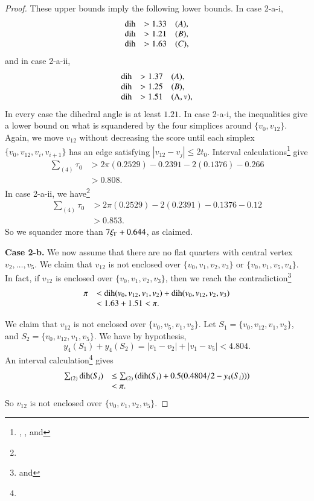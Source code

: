 \begin{proof}
These upper bounds imply the following lower bounds.  In case
2-a-i,
$$
\begin{array}{lll}
\operatorname{dih} &> 1.33 \quad(A),\\
\operatorname{dih} &> 1.21 \quad(B),\\
\operatorname{dih} &> 1.63 \quad(C),\\
\end{array}
$$
and in case 2-a-ii,
$$
\begin{array}{lll}
\operatorname{dih} &> 1.37 \quad(A),\\
\operatorname{dih} &> 1.25 \quad(B),\\
\operatorname{dih} &> 1.51 \quad(\Lambda,v),\\
\end{array}
$$
In every case the dihedral angle is at least $1.21$. In case
2-a-i, the inequalities give a lower bound on what is squandered
by the four simplices around $\{v_0,v_{12}\}$. Again, we move $v_{12}$
without decreasing the score until each simplex
$\{v_0,v_{12},v_i,v_{i+1}\}$ has an edge satisfying
$|v_{12}-v_j|\le2t_0$. Interval
calculations\footnote{, , and
} give
    $$
    \begin{array}{lll}
    \sum_{(4)}\tau_0 &> 2\pi (0.2529) - 0.2391-2(0.1376)-0.266\\
        &>0.808.
    \end{array}
    $$
In case 2-a-ii, we have\footnote{}
    $$
    \begin{array}{lll}
    \sum_{(4)}\tau_0 &> 2\pi (0.2529) - 2(0.2391)-0.1376-0.12\\
        &>0.853.
    \end{array}
    $$
So we squander more than $7\xi_\Gamma+0.644$, as claimed.

{\bf Case 2-b.}  We now assume that there are no flat quarters
with central vertex $v_2,\ldots,v_5$. We claim
 that $v_{12}$ is not enclosed over $\{v_0,v_1,v_2,v_3\}$ or
$\{v_0,v_1,v_5,v_4\}$. In fact, if $v_{12}$ is enclosed over
$\{v_0,v_1,v_2,v_3\}$, then we reach the
contradiction\footnote{ and }
    $$
    \begin{array}{lll}
    \pi&<\operatorname{dih}(v_0,v_{12},v_1,v_2)+\operatorname{dih}(v_0,v_{12},v_2,v_3)\\
        &< 1.63+1.51 < \pi.
    \end{array}
    $$

We claim
 that $v_{12}$ is not enclosed over $\{v_0,v_5,v_1,v_2\}$.
Let $S_1=\{v_0,v_{12},v_1,v_2\}$, and $S_2=\{v_0,v_{12},v_1,v_5\}$.  We
have by hypothesis,
$$y_4(S_1)+y_4(S_2) = |v_1-v_2|+|v_1-v_5|< 4.804.$$
An interval calculation\footnote{} gives
    $$
    \begin{array}{lll}
    \sum_{(2)}\operatorname{dih}(S_i) &\le \sum_{(2)}
    \left(\operatorname{dih}(S_i)+0.5(0.4804/2-y_4(S_i))\right)\\
    &<\pi.
    \end{array}
    $$
So $v_{12}$ is not enclosed over $\{v_0,v_1,v_2,v_5\}$.


\end{proof}
